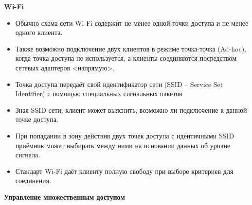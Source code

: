 \textbf{\textbf{Wi-Fi}}

\begin{itemize}
    \item Обычно схема сети Wi-Fi содержит не менее одной точки доступа и не менее одного клиента. 
    \item Также возможно подключение двух клиентов в режиме точка-точка (Ad-hoc), когда точка доступа не используется, а клиенты соединяются посредством сетевых адаптеров <напрямую>. 
    \item Точка доступа передаёт свой идентификатор сети (SSID -- Service Set Identifier) с помощью специальных сигнальных пакетов
    \item Зная SSID сети, клиент может выяснить, возможно ли подключение к данной точке доступа. 
    \item При попадании в зону действия двух точек доступа с идентичными SSID приёмник может выбирать между ними на основании данных об уровне сигнала. 
    \item Стандарт Wi-Fi даёт клиенту полную свободу при выборе критериев для соединения.
\end{itemize}

\textbf{\textbf{Управление множественным доступом}}

